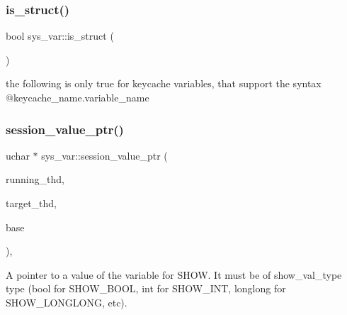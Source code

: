 \subsubsection{\texorpdfstring{is\+\_\+struct()}{is\_struct()}}
{\footnotesize\ttfamily bool sys\+\_\+var\+::is\+\_\+struct (\begin{DoxyParamCaption}{ }\end{DoxyParamCaption})\hspace{0.3cm}{\ttfamily [inline]}}

the following is only true for keycache variables, that support the syntax @keycache\+\_\+name.\+variable\+\_\+name \mbox{\label{classsys__var_a3e511591aaf555d2bc2ce40a80b7e899}} 
\subsubsection{\texorpdfstring{session\+\_\+value\+\_\+ptr()}{session\_value\_ptr()}}
{\footnotesize\ttfamily uchar $\ast$ sys\+\_\+var\+::session\+\_\+value\+\_\+ptr (\begin{DoxyParamCaption}\item[{T\+HD $\ast$}]{running\+\_\+thd,  }\item[{T\+HD $\ast$}]{target\+\_\+thd,  }\item[{L\+E\+X\+\_\+\+S\+T\+R\+I\+NG $\ast$}]{base }\end{DoxyParamCaption})\hspace{0.3cm}{\ttfamily [protected]}, {\ttfamily [virtual]}}

A pointer to a value of the variable for S\+H\+OW. It must be of show\+\_\+val\+\_\+type type (bool for S\+H\+O\+W\+\_\+\+B\+O\+OL, int for S\+H\+O\+W\+\_\+\+I\+NT, longlong for S\+H\+O\+W\+\_\+\+L\+O\+N\+G\+L\+O\+NG, etc). 

